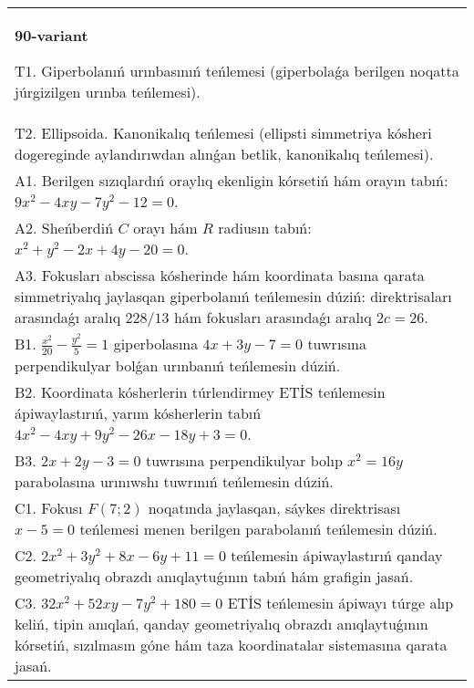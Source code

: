 \documentclass{article}
\begin{document}
\begin{tabular}{m{17cm}}
\textbf{90-variant}
\newline

T1. Giperbolanıń urınbasınıń teńlemesi (giperbolaǵa berilgen noqatta júrgizilgen urınba teńlemesi).\\

T2. Ellipsoida. Kanonikalıq teńlemesi (ellipsti simmetriya kósheri dogereginde aylandırıwdan alınǵan betlik, kanonikalıq teńlemesi).\\

A1. Berilgen sızıqlardıń oraylıq ekenligin kórsetiń hám orayın tabıń: $9 x^{2}-4 xy-7 y^{2}-12=0$.\\

A2. Sheńberdiń $C$ orayı hám $R$ radiusın tabıń: $x^2+y^2-2 x+4 y-20=0$.\\

A3. Fokusları abscissa kósherinde hám koordinata basına qarata simmetriyalıq jaylasqan giperbolanıń teńlemesin dúziń: direktrisaları arasındaǵı aralıq $228/13$ hám fokusları arasındaǵı aralıq $2 c=26$.\\

B1. $\frac{x^{2}}{20} - \frac{y^{2}}{5} = 1$ giperbolasına $4x + 3y - 7 = 0$ tuwrısına perpendikulyar bolǵan urınbanıń teńlemesin dúziń.  \\

B2. Koordinata kósherlerin túrlendirmey ETİS teńlemesin ápiwaylastırıń, yarım kósherlerin tabıń $4x^{2} - 4xy + 9y^{2} - 26x - 18y + 3 = 0$.\\

B3. $2x + 2y - 3 = 0$ tuwrısına perpendikulyar bolıp $x^{2} = 16y$ parabolasına urınıwshı tuwrınıń teńlemesin dúziń.  \\

C1. Fokusı $F(7;2)$ noqatında jaylasqan, sáykes direktrisası $x - 5 = 0$ teńlemesi menen berilgen parabolanıń teńlemesin dúziń.  \\

C2. $2x^{2} + 3y^{2} + 8x - 6y + 11 = 0$ teńlemesin ápiwaylastırıń qanday geometriyalıq obrazdı anıqlaytuǵının tabıń hám grafigin jasań.\\

C3. $32x^{2} + 52xy - 7y^{2} + 180 = 0$ ETİS teńlemesin ápiwayı túrge alıp keliń, tipin anıqlań, qanday geometriyalıq obrazdı anıqlaytuǵının kórsetiń, sızılmasın góne hám taza koordinatalar sistemasına qarata jasań.  \\

\end{tabular}
\vspace{1cm}
\end{document}
